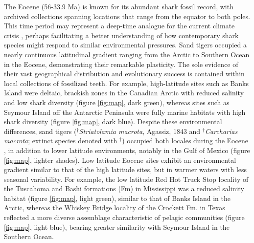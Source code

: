 \documentclass[]{rsos}%
\begin{document}
The Eocene (56-33.9 Ma) is known for its abundant shark fossil record, with archived collections spanning locations that range from the equator to both poles.
This time period may represent a deep-time analogue for the current climate crisis \cite{burke2018pliocene}, perhaps facilitating a better understanding of how contemporary shark species might respond to similar environmental pressures.
Sand tigers occupied a nearly continuous latitudinal gradient ranging from the Arctic to Southern Ocean in the Eocene, demonstrating their remarkable plasticity. 
The sole evidence of their vast geographical distribution and evolutionary success is contained within local collections of fossilized teeth.
For example, high-latitude sites such as Banks Island were deltaic, brackish zones in the Canadian Arctic with reduced salinity \cite{Waddell2008, Kim2014d} and low shark diversity \cite{padilla2014sand} (figure \ref{fig:map}, dark green), whereas sites such as Seymour Island off the Antarctic Peninsula were fully marine  habitats \cite{Ivany2008} with high shark diversity \cite{Kriwet2016} (figure \ref{fig:map}, dark blue).
Despite these environmental differences, sand tigers  (${}^\dag$\emph{Striatolamia macrota}, Agassiz, 1843 and ${}^\dag$\emph{Carcharias macrota}; extinct species denoted with ${}^\dag$) occupied both locales during the Eocene \cite{Padilla2014,Kriwet2016}, in addition to lower latitude environments, notably in the Gulf of Mexico \cite{Westgate} (figure \ref{fig:map}, lighter shades).
Low latitude Eocene sites exhibit an environmental gradient similar to that of the high latitude sites, but in warmer waters with less seasonal variability.
For example, the low latitude Red Hot Truck Stop locality of the Tuscahoma and Bashi formations (Fm) in Mississippi was a reduced salinity habitat \cite{Beard2009} (figure \ref{fig:map}, light green), similar to that of Banks Island in the Arctic, whereas the Whiskey Bridge locality of the Crockett Fm. in Texas reflected a more diverse assemblage characteristic of pelagic communities \cite{Westgate} (figure \ref{fig:map}, light blue), bearing greater similarity with Seymour Island in the Southern Ocean. 
\end{document}
